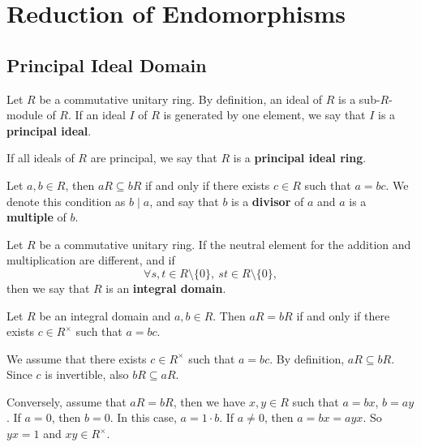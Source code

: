 \chapter{Reduction of Endomorphisms}

\section{Principal Ideal Domain}

\begin{definitionenv}
    Let $R$ be a commutative unitary ring.
    By definition, an ideal of $R$ is a sub-$R$-module of $R$. 
    If an ideal $I$ of $R$ is generated by one element, we say that $I$ is a \textbf{principal ideal}.

    \quad If all ideals of $R$ are principal, we say that $R$ is a \textbf{principal ideal ring}.

    \quad Let $a,b \in R$, then $aR \subseteq bR$ if and only if there exists $c \in R$ such that $a = b c$.
    We denote this condition as $b \mid a$, and say that $b$ is a \textbf{divisor} of $a$ and $a$ is a \textbf{multiple} of $b$.
\end{definitionenv}

\begin{definitionenv}\label{prop:6.1.3}
    Let $R$ be a commutative unitary ring.
    If the neutral element for the addition and multiplication are different, and if
    $$\forall s,t \in R\setminus\{0\},\ st \in R\setminus \{0\},$$
    then we say that $R$ is an \textbf{integral domain}.
\end{definitionenv}

\begin{propositionenv}
    Let $R$ be an integral domain and $a,b \in R$.
    Then $aR = bR$ if and only if there exists $c \in R^\times$ such that $a = b c$.
\end{propositionenv}
\begin{proofenv}
    We assume that there exists $c \in R^\times$ such that $a = b c$.
    By definition, $aR \subseteq bR$.
    Since $c$ is invertible, also $bR \subseteq aR$.

    \quad Conversely, assume that $aR = bR$, then we have $x,y \in R$ such that $a = b x$, $b = a y$.
    If $a = 0$, then $b = 0$.
    In this case, $a = 1 \cdot b$.
    If $a \neq 0$, then $a = b x = a y x$.
    So $y x = 1$ and $x y \in R^\times$.
\end{proofenv}

